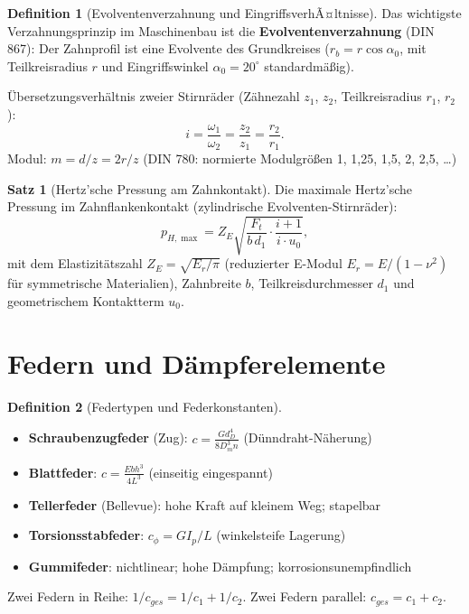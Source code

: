 ﻿\documentclass[a4paper,12pt]{report}
\theoremstyle{definition}
\newtheorem{definition}{Definition}
\newtheorem{satz}{Satz}
\begin{document}
\begin{definition}[Evolventenverzahnung und EingriffsverhÃ¤ltnisse]
Das wichtigste Verzahnungsprinzip im Maschinenbau ist die
\textbf{Evolventenverzahnung} (DIN 867): Der Zahnprofil ist eine Evolvente
des Grundkreises ($r_b = r\cos\alpha_0$, mit Teilkreisradius $r$ und
Eingriffswinkel $\alpha_0 = 20^\circ$ standardm\"a\ss{}ig).

\"Ubersetzungsverh\"altnis zweier Stirnr\"ader (Z\"ahnezahl $z_1$, $z_2$,
Teilkreisradius $r_1$, $r_2$):
\[
  i = \frac{\omega_1}{\omega_2} = \frac{z_2}{z_1} = \frac{r_2}{r_1}.
\]
Modul: $m = d/z = 2r/z$ (DIN 780: normierte Modulgr\"o\ss{}en 1, 1{,}25, 1{,}5, 2, 2{,}5, \ldots)
\end{definition}

\begin{satz}[Hertz'sche Pressung am Zahnkontakt]
Die maximale Hertz'sche Pressung im Zahnflankenkontakt
(zylindrische Evolventen-Stirnr\"ader):
\[
  p_{H,\max} = Z_E\sqrt{\frac{F_t}{b\,d_1}\cdot\frac{i+1}{i\cdot u_0}},
\]
mit dem Elastizit\"atszahl $Z_E = \sqrt{E_r/\pi}$ (reduzierter E-Modul
$E_r = E/(1-\nu^2)$ f\"ur symmetrische Materialien), Zahnbreite $b$,
Teilkreisdurchmesser $d_1$ und geometrischem Kontaktterm $u_0$.
\end{satz}

\section{Federn und D\"ampferelemente}

\begin{definition}[Federtypen und Federkonstanten]
\begin{itemize}
    \item[-] \textbf{Schraubenzugfeder} (Zug): $c = \frac{G d_D^4}{8 D_m^3 n}$ (D\"unndraht-N\"aherung)
    \item[-] \textbf{Blattfeder}: $c = \frac{E b h^3}{4L^3}$ (einseitig eingespannt)
    \item[-] \textbf{Tellerfeder} (Bellevue): hohe Kraft auf kleinem Weg; stapelbar
    \item[-] \textbf{Torsionsstabfeder}: $c_\phi = GI_p/L$ (winkelsteife Lagerung)
    \item[-] \textbf{Gummifeder}: nichtlinear; hohe D\"ampfung; korrosionsunempfindlich
\end{itemize}
Zwei Federn in Reihe: $1/c_{ges} = 1/c_1 + 1/c_2$.
Zwei Federn parallel: $c_{ges} = c_1 + c_2$.
\end{definition}
\end{document}
